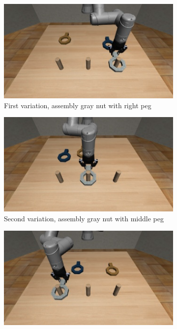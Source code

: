 \begin{figure}[htb]
    \centering
    \begin{subfigure}[b]{0.4\textwidth}
        \centering
        \includegraphics[width=\textwidth]{Figures/images/nut_assembly/task_1.png}
        \caption{First variation, assembly gray nut with right peg}
        \label{fig:first_variation_nut}
    \end{subfigure}
    \hfill
    \begin{subfigure}[b]{0.4\textwidth}
        \centering
        \includegraphics[width=\textwidth]{Figures/images/nut_assembly/task_2.png}
        \caption{Second variation, assembly gray nut with middle peg}
        \label{fig:second_variation_nut}
    \end{subfigure}
    \hfil
    \begin{subfigure}[b]{0.4\textwidth}
        \centering
        \includegraphics[width=\textwidth]{Figures/images/nut_assembly/task_3.png}

\end{subfigure}
\end{figure}
